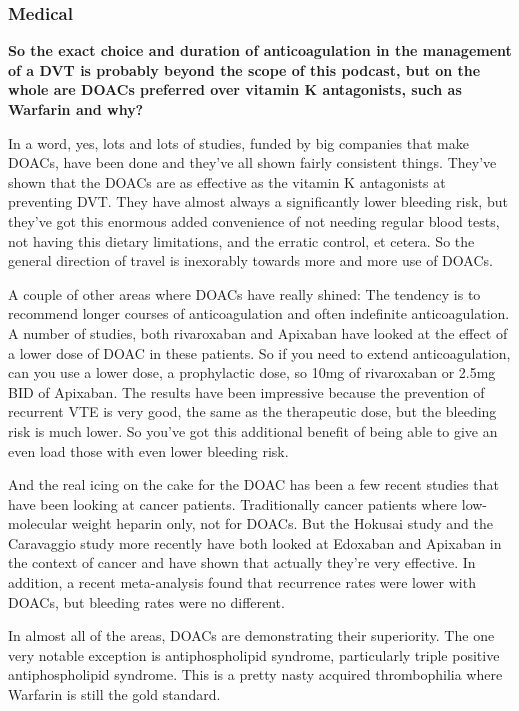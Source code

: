 \documentclass[
]{book}
\begin{document}
\hypertarget{medical}{%
\subsubsection{Medical}\label{medical}}

\textbf{So the exact choice and duration of anticoagulation in the management
of a DVT is probably beyond the scope of this podcast, but on the whole
are DOACs preferred over vitamin K antagonists, such as Warfarin and
why?}

In a word, yes, lots and lots of studies, funded by big companies that
make DOACs, have been done and they've all shown fairly consistent
things. They've shown that the DOACs are as effective as the vitamin K
antagonists at preventing DVT. They have almost always a significantly
lower bleeding risk, but they've got this enormous added convenience of
not needing regular blood tests, not having this dietary limitations,
and the erratic control, et cetera. So the general direction of travel
is inexorably towards more and more use of DOACs.

A couple of other areas where DOACs have really shined: The tendency is
to recommend longer courses of anticoagulation and often indefinite
anticoagulation. A number of studies, both rivaroxaban and Apixaban have
looked at the effect of a lower dose of DOAC in these patients. So if
you need to extend anticoagulation, can you use a lower dose, a
prophylactic dose, so 10mg of rivaroxaban or 2.5mg BID of Apixaban. The
results have been impressive because the prevention of recurrent VTE is
very good, the same as the therapeutic dose, but the bleeding risk is
much lower. So you've got this additional benefit of being able to give
an even load those with even lower bleeding risk.

And the real icing on the cake for the DOAC has been a few recent
studies that have been looking at cancer patients. Traditionally cancer
patients where low-molecular weight heparin only, not for
DOACs.\citep{kearon2016} But the Hokusai study\citep{raskob2018} and the
Caravaggio study\citep{agnelli2020} more recently have both looked at
Edoxaban and Apixaban in the context of cancer and have shown that
actually they're very effective. In addition, a recent meta-analysis
found that recurrence rates were lower with DOACs, but bleeding rates
were no different.\citep{dong2019, rossel2019}

In almost all of the areas, DOACs are demonstrating their superiority.
The one very notable exception is antiphospholipid syndrome,
particularly triple positive antiphospholipid syndrome. This is a pretty
nasty acquired thrombophilia where Warfarin is still the gold
standard.\citep{pengo2018}
\end{document}
